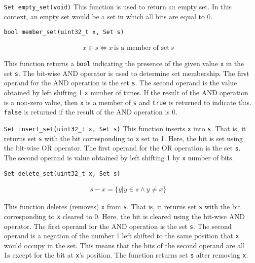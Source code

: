 \begin{funcdoc}{\texttt{Set empty\_set(void)}}
  This function is used to return an empty set. In this context, an empty
  set would be a set in which all bits are equal to 0.
\end{funcdoc}

\begin{funcdoc}{\texttt{bool member\_set(uint32\_t x, Set s)}}

\begin{align*}
  x \in s \iff x\, \text{is a member of set}\, s
\end{align*}

  \noindent This function returns a \texttt{bool} indicating the
  presence of the given value \texttt{x} in the set \texttt{s}. The
  bit-wise AND operator is used to determine set membership. The first
  operand for the AND operation is the set \texttt{s}. The second
  operand is the value obtained by left shifting 1 \texttt{x} number of
  times. If the result of the AND operation is a non-zero value, then
  \texttt{x} is a member of \texttt{s} and \texttt{true} is returned to
  indicate this. \texttt{false} is returned if the result of the AND
  operation is 0.
\end{funcdoc}

\begin{funcdoc}{\texttt{Set insert\_set(uint32\_t x, Set s)}}
  This function inserts \texttt{x} into \texttt{s}. That is, it returns
  set \texttt{s} with the bit corresponding to \texttt{x} set to 1.
  Here, the bit is set using the bit-wise OR operator. The first operand
  for the OR operation is the set \texttt{s}. The second operand is
  value obtained by left shifting 1 by \texttt{x} number of bits.
\end{funcdoc}

\begin{funcdoc}{\texttt{Set delete\_set(uint32\_t x, Set s)}}

\begin{align*}
  s - x = \{y | y \in s \land y \ne x\}
\end{align*}

  This function deletes (removes) \texttt{x} from \texttt{s}. That is,
  it returns set \texttt{s} with the bit corresponding to \texttt{x}
  cleared to 0. Here, the bit is cleared using the bit-wise AND
  operator. The first operand for the AND operation is the set
  \texttt{s}. The second operand is a negation of the number 1 left
  shifted to the same position that \texttt{x} would occupy in the set.
  This means that the bits of the second operand are all 1s except for
  the bit at \texttt{x}'s position. The function returns set \texttt{s}
  after removing \texttt{x}.
\end{funcdoc}

